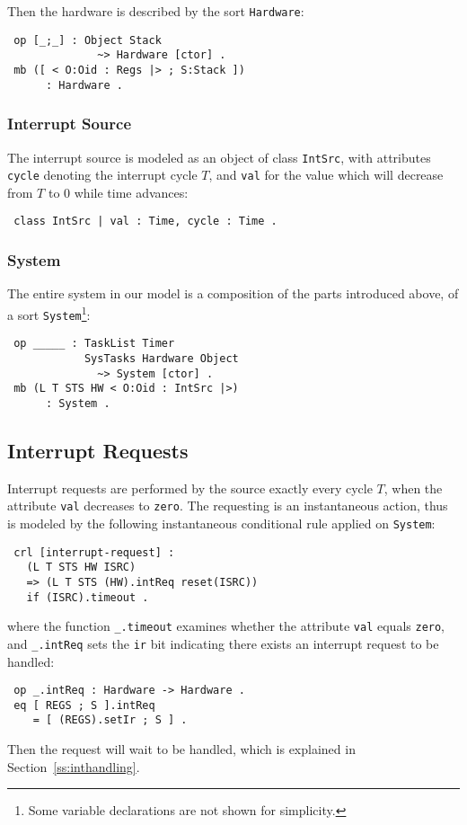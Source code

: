 \documentclass[10pt,journal]{IEEEtran}
\begin{document}
Then the hardware is described by the sort \verb|Hardware|:
\begin{verbatim}
 op [_;_] : Object Stack 
              ~> Hardware [ctor] .
 mb ([ < O:Oid : Regs |> ; S:Stack ]) 
      : Hardware .
\end{verbatim}

\subsubsection{Interrupt Source}
The interrupt source is modeled as an object of class \verb|IntSrc|,
with attributes \verb|cycle| denoting the interrupt cycle $T$, and
\verb|val| for the value which will decrease from $T$ to $0$ while
time advances:
\begin{verbatim}
 class IntSrc | val : Time, cycle : Time .
\end{verbatim}

\subsubsection{System}
The entire system in our model is a composition of the parts
introduced above, of a sort \verb|System|\footnote{Some variable
  declarations are not shown for simplicity.}:
\begin{verbatim}
 op _____ : TaskList Timer 
            SysTasks Hardware Object 
              ~> System [ctor] .
 mb (L T STS HW < O:Oid : IntSrc |>) 
      : System .
\end{verbatim}

\subsection{Interrupt Requests}
\label{ss:ir}
Interrupt requests are performed by the source exactly every cycle
$T$, when the attribute \verb|val| decreases to \verb|zero|. The
requesting is an instantaneous action, thus is modeled by the
following instantaneous conditional rule applied on \verb|System|:
\begin{verbatim}
 crl [interrupt-request] :
   (L T STS HW ISRC) 
   => (L T STS (HW).intReq reset(ISRC))
   if (ISRC).timeout .
\end{verbatim}
where the function \verb|_.timeout| examines whether the attribute
\verb|val| equals \verb|zero|, and \verb|_.intReq| sets the \verb|ir|
bit indicating there exists an interrupt request to be handled:
\begin{verbatim}
 op _.intReq : Hardware -> Hardware .
 eq [ REGS ; S ].intReq 
    = [ (REGS).setIr ; S ] .
\end{verbatim}
Then the request will wait to be handled, which is explained in
Section~\ref{ss:inthandling}.
\end{document}
